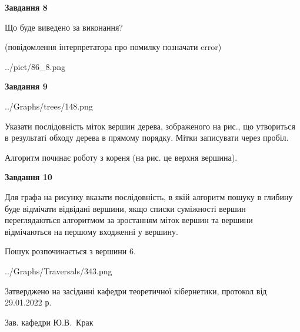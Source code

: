 \documentclass[12pt, ukrainian]{article}
\begin{document}
{\begin {large}
{\begin {center}\textbf{Завдання 8}\end {center}}\par
Що буде виведено за виконання?\par
 (повідомлення інтерпретатора про помилку позначати error)\par
\begin{center}
	{../pict/86_8.png}
\end{center}
\newpage

{\begin {center}\textbf{Завдання 9}\end {center}}\par

\begin{center}
	{../Graphs/trees/148.png}
\end{center}
Указати послідовність міток вершин дерева, зображеного на рис., що утвориться в результаті обходу дерева в прямому порядку. Мітки записувати через пробіл.\par Алгоритм починає роботу з кореня (на рис. це верхня вершина).\par
\newpage

{\begin {center}\textbf{Завдання 10}\end {center}}\par
Для графа на рисунку вказати послідовність, в якій алгоритм пошуку в глибину буде відмічати відвідані вершини, якщо списки суміжності вершин переглядаються алгоритмом за зростанням міток вершин та вершини відмічаються на першому вход\-женні у вершину.\par
Пошук розпочинається з вершини 6.\par

\begin{center}
	{../Graphs/Traversals/343.png}
\end{center}\par
\newpage


\end {large}
}
{\smallskip \begin {small} Затверджено на засіданні кафедри теоретичної кібернетики, протокол  від   29.01.2022 р.\par\smallskip\smallskip
{\parbox {6.5 cm}{Зав. кафедри \dotfill Ю.В.~Крак}} \end{small}}
\end{document}
